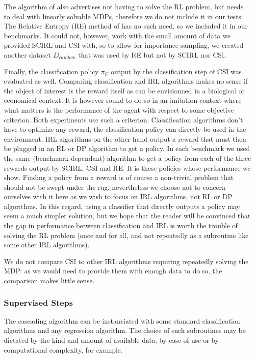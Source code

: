 \documentclass[smallextended]{svjour3}
\begin{document}
The algorithm of \cite{dvijotham2010inverse} also advertises not having to solve the RL problem, but needs to deal with linearly solvable MDPs, therefore we do not include it in our tests. The Relative Entropy (RE) method of \cite{boularias2011relative} has no such need, so we included it in our benchmarks. It could not, however, work with the small amount of data we provided SCIRL and CSI with, so to allow for importance sampling, we created another dataset $D_{random}$ that was used by RE but not by SCIRL nor CSI.

Finally, the classification policy $\pi_C$ output by the classification step of CSI was evaluated as well. Comparing classification and IRL algorithms makes no sense if the object of interest is the reward itself as can be envisionned in a biological or economical context. It is however sound to do so in an imitation context where what matters is the performance of the agent with respect to some objective criterion. Both experiments use such a criterion. Classification algorithms don't have to optimize any reward, the classification policy can directly be used in the environment. IRL algorithms on the other hand output a reward that must then be plugged in an RL or DP algorithm to get a policy. In each benchmark we used the same (benchmark-dependant) algorithm to get a policy from each of the three rewards output by SCIRL, CSI and RE. It is these policies whose performance we show. Finding a policy from a reward is of course a non-trivial problem that should not be swept under the rug, nevertheless we choose not to concern ourselves with it here as we wish to focus on IRL algorithms, not RL or DP algorithms. In this regard, using a classifier that directly outputs a policy may seem a much simpler solution, but we hope that the reader will be convinced that the gap in performance between classification and IRL is worth the trouble of solving the RL problem (once and for all, and not repeatedly as a subroutine like some other IRL algorithms).

We do not compare CSI to other IRL algorithms requiring repeatedly solving the MDP: as we would need to provide them with enough data to do so, the comparison makes little sense.
\subsubsection{Supervised Steps}
\label{subsubsec:subroutines}
The cascading algorithm can be instanciated with some standard classification algorithms and any regression algorithm. The choice of such subroutines may be dictated by the kind and amount of available data, by ease of use or by computational complexity, for example.
\end{document}
